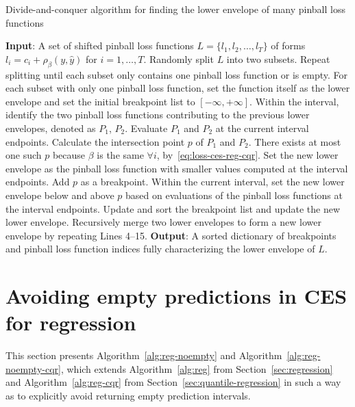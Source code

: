 \begin{algorithm}[H]
    \color{blue}
    \caption{Divide-and-conquer algorithm for finding the lower envelope of many pinball loss functions}
    \label{alg:envelope-cqr}
    \begin{algorithmic} [1]
        \STATE \textbf{Input}: A set of shifted pinball loss functions $L = \{l_1, l_2, \dots, l_T \}$ of forms $l_i = c_i + \rho_\beta(y, \hat{y})$ for $i=1,\dots, T$.
        \STATE Randomly split $L$ into two subsets. Repeat splitting until each subset only contains one pinball loss function or is empty.
        \STATE For each subset with only one pinball loss function, set the function itself as the lower envelope and set the initial breakpoint list to $[-\infty, +\infty]$.
            \STATE Within the interval, identify the two pinball loss functions contributing to the previous lower envelopes, denoted as $P_1$, $P_2$.
            \STATE Evaluate $P_1$ and $P_2$ at the current interval endpoints.
            \STATE Calculate the intersection point $p$ of $P_1$ and $P_2$. There exists at most one such $p$ because $\beta$ is the same $\forall i$, by~\eqref{eq:loss-ces-reg-cqr}.
            \STATE Set the new lower envelope as the pinball loss function with smaller values computed at the interval endpoints.
            \ELSE \STATE Add $p$ as a breakpoint.
            \STATE Within the current interval, set the new lower envelope below and above $p$ based on evaluations of the pinball loss functions at the interval endpoints.
            \ENDIF
            \STATE Update and sort the breakpoint list and update the new lower envelope.
        \ENDFOR
        \STATE Recursively merge two lower envelopes to form a new lower envelope by repeating Lines 4--15.
        \STATE \textbf{Output}: A sorted dictionary of breakpoints and pinball loss function indices fully characterizing the lower envelope of $L$.
\end{algorithmic}
\end{algorithm}



\section{Avoiding empty predictions in CES for regression} \label{app:reg-noempty}

This section presents Algorithm~\ref{alg:reg-noempty} and Algorithm~\ref{alg:reg-noempty-cqr}, which extends Algorithm~\ref{alg:reg} from Section~\ref{sec:regression} and Algorithm~\ref{alg:reg-cqr} from Section~\ref{sec:quantile-regression} in such a way as to explicitly avoid returning empty prediction intervals.

